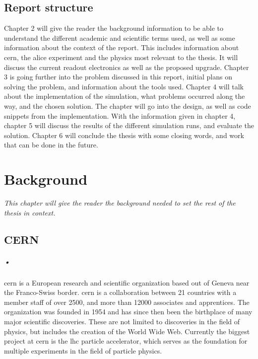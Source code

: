 \documentclass[a4paper, 12pt]{report}\dfrac{\right }{•}
\begin{document}
\section{Report structure}
Chapter 2 will give the reader the background information to be able to understand the different academic and scientific terms used, as well as some information about the context of the report.
This includes information about \gls{cern}, the \gls{alice} experiment and the physics most relevant to the thesis.
It will discuss the current readout electronics as well as the proposed upgrade.
Chapter 3 is going further into the problem discussed in this report, initial plans on solving the problem, and information about the tools used.
Chapter 4 will talk about the implementation of the simulation, what problems occurred along the way, and the chosen solution.
The chapter will go into the design, as well as code snippets from the implementation.
With the information given in chapter 4, chapter 5 will discuss the results of the different simulation runs, and evaluate the solution.
Chapter 6 will conclude the thesis with some closing words, and work that can be done in the future.


\chapter{Background}
\textit{This chapter will give the reader the background needed to set the rest of the thesis in context.}

\section{CERN}
\paragraph{•}
\gls{cern} is a European research and scientific organization based out of Geneva near the Franco-Swiss border\cite{cern}.
\gls{cern} is a collaboration between 21 countries with a member staff of over 2500, and more than 12000 associates and apprentices.
The organization was founded in 1954 and has since then been the birthplace of many major scientific discoveries.
These are not limited to discoveries in the field of physics, but includes the creation of the World Wide Web\cite{www}.
Currently the biggest project at \gls{cern} is the \gls{lhc} particle accelerator, which serves as the foundation for multiple experiments in the field of particle physics.
\end{document}
